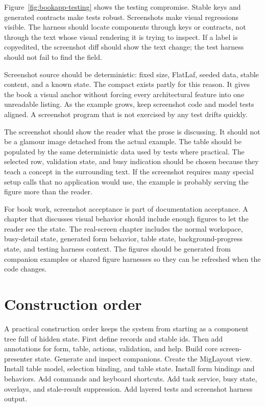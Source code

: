 Figure~\ref{fig:bookapp-testing} shows the testing compromise. Stable keys
and generated contracts make tests robust. Screenshots make visual regressions
visible. The harness should locate components through keys or contracts, not
through the text whose visual rendering it is trying to inspect. If a label is
copyedited, the screenshot diff should show the text change; the test harness
should not fail to find the field.

Screenshot source should be deterministic: fixed size, FlatLaf, seeded data,
stable content, and a known state. The compact \bookAppExample{} exists partly
for this reason. It gives the book a visual anchor without forcing every
architectural feature into one unreadable listing. As the example grows, keep
screenshot code and model tests aligned. A screenshot program that is not
exercised by any test drifts quickly.

The screenshot should show the reader what the prose is discussing. It should
not be a glamour image detached from the actual example. The table should be
populated by the same deterministic data used by tests where practical. The
selected row, validation state, and busy indication should be chosen because
they teach a concept in the surrounding text. If the screenshot requires many
special setup calls that no application would use, the example is probably
serving the figure more than the reader.

For book work, screenshot acceptance is part of documentation acceptance. A
chapter that discusses visual behavior should include enough figures to let
the reader see the state. The real-screen chapter includes the normal
workspace, busy-detail state, generated form behavior, table state,
background-progress state, and testing harness context. The figures should be
generated from companion examples or shared figure harnesses so they can be
refreshed when the code changes.

\section{Construction order}

A practical construction order keeps the system from starting as a component
tree full of hidden state. First define records and stable ids. Then add
annotations for form, table, actions, validation, and help. Build core
screen-presenter state. Generate and inspect companions. Create the MigLayout view.
Install table model, selection binding, and table state. Install form bindings
and behaviors. Add commands and keyboard shortcuts. Add task service, busy
state, overlays, and stale-result suppression. Add layered tests and
screenshot harness output.

